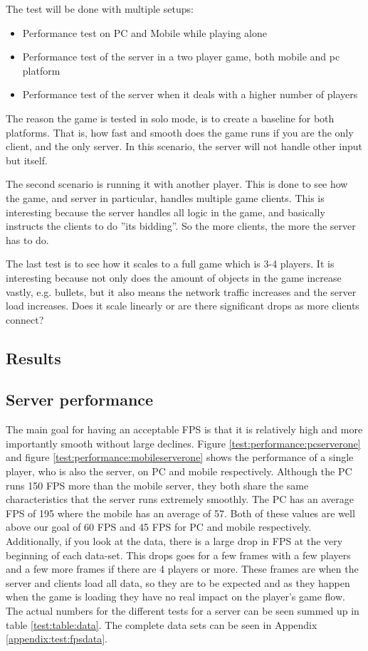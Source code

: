The test will be done with multiple setups:
\begin{itemize}
\item Performance test on PC and Mobile while playing alone
\item Performance test of the server in a two player game, both mobile and pc platform
\item Performance test of the server when it deals with a higher number of players
\end{itemize}

The reason the game is tested in solo mode, is to create a baseline for both platforms. 
That is, how fast and smooth does the game runs if you are the only client, and the only server. 
In this scenario, the server will not handle other input but itself.

The second scenario is running it with another player. This is done to see how the game, and server in particular, handles multiple game clients. 
This is interesting because the server handles all logic in the game, and basically instructs the clients to do ''its bidding''. 
So the more clients, the more the server has to do. 

The last test is to see how it scales to a full game which is 3-4 players. 
It is interesting because not only does the amount of objects in the game increase vastly, e.g. bullets, but it also means the network traffic increases and the server load increases. 
Does it scale linearly or are there significant drops as more clients connect?

\subsection{Results}
\subsection*{Server performance}
The main goal for having an acceptable FPS is that it is relatively high and more importantly smooth without large declines. 
Figure \ref{test:performance:pcserverone} and figure \ref{test:performance:mobileserverone} shows the performance of a single player, who is also the server, on PC and mobile respectively. 
Although the PC runs 150 FPS more than the mobile server, they both share the same characteristics that the server runs extremely smoothly. 
The PC has an average FPS of 195 where the mobile has an average of 57. Both of these values are well above our goal of 60 FPS and 45 FPS for PC and mobile respectively. 
Additionally, if you look at the data, there is a large drop in FPS at the very beginning of each data-set. 
This drops goes for a few frames with a few players and a few more frames if there are 4 players or more. 
These frames are when the server and clients load all data, so they are to be expected and as they happen when the game is loading they have no real impact on the player's game flow. 
The actual numbers for the different tests for a server can be seen summed up in table \ref{test:table:data}. 
The complete data sets can be seen in Appendix \ref{appendix:test:fpsdata}.

